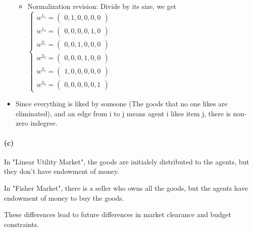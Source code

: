 \documentclass{article}
\newenvironment{answer}{\par\color{ForestGreen}}{\par}
\begin{document}
\begin{answer}
\begin{itemize}
\begin{itemize}
      \item Normalization revision: Divide by its size, we get
      $\begin{cases}
         w^{1_1} = \begin{pmatrix} 0, 1, 0, 0, 0, 0 \end{pmatrix} \\
         w^{1_2} = \begin{pmatrix} 0, 0, 0, 0, 1, 0 \end{pmatrix} \\
         w^{2_1} = \begin{pmatrix} 0, 0, 1, 0, 0, 0 \end{pmatrix} \\
         w^{2_2} = \begin{pmatrix} 0, 0, 0, 1, 0, 0 \end{pmatrix} \\
         w^{3_1} = \begin{pmatrix} 1, 0, 0, 0, 0, 0 \end{pmatrix} \\
         w^{3_2} = \begin{pmatrix} 0, 0, 0, 0, 0, 1 \end{pmatrix}
       \end{cases} $
    \end{itemize}


    \item Since everything is liked by someone (The goods that no one likes are eliminated), and an edge from i to j means agent i likes item j, there is non-zero indegree.
  \end{itemize}

  \paragraph{(c)}
  \hfill \break
  In "Linear Utility Market", the goods are initialely distributed to the agents, but they don't have endowment of money.

  In "Fisher Market", there is a seller who owns all the goods, but the agents have endowment of money to buy the goods.


  These differences lead to future differences in market clearance and budget constraints.
\end{answer}
\end{document}
